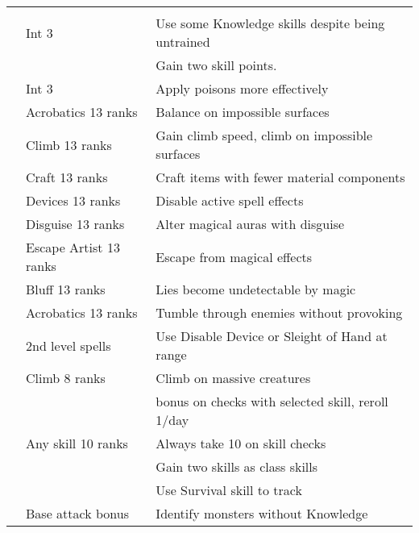 {\begin{longtabu}{>{\lcol}p{15em} >{\lcol}p{15em} >{\lcol}X}
\midrule
{} &  &  \\
 & Int 3 & Use some Knowledge skills despite being untrained \\
 & \x & Gain two skill points. \\
 & Int 3 & Apply poisons more effectively \\
 & Acrobatics 13 ranks & Balance on impossible surfaces \\
 & Climb 13 ranks & Gain climb speed, climb on impossible surfaces \\
 & Craft 13 ranks & Craft items with fewer material components \\
 & Devices 13 ranks & Disable active spell effects \\
 & Disguise 13 ranks & Alter magical auras with disguise \\
 & Escape Artist 13 ranks & Escape from magical effects \\
 & Bluff 13 ranks & Lies become undetectable by magic \\
 & Acrobatics 13 ranks & Tumble through enemies without provoking \\
 &  2nd level spells & Use Disable Device or Sleight of Hand at range \\
 & Climb 8 ranks & Climb on massive creatures \\
 & \x &   bonus on checks with selected skill, reroll 1/day \\
 & Any skill 10 ranks & Always take 10 on skill checks \\
 & \x & Gain two skills as class skills \\
 & \x &  Use Survival skill to track \\
 & Base attack bonus  & Identify monsters without Knowledge \\


\end{longtabu}}
